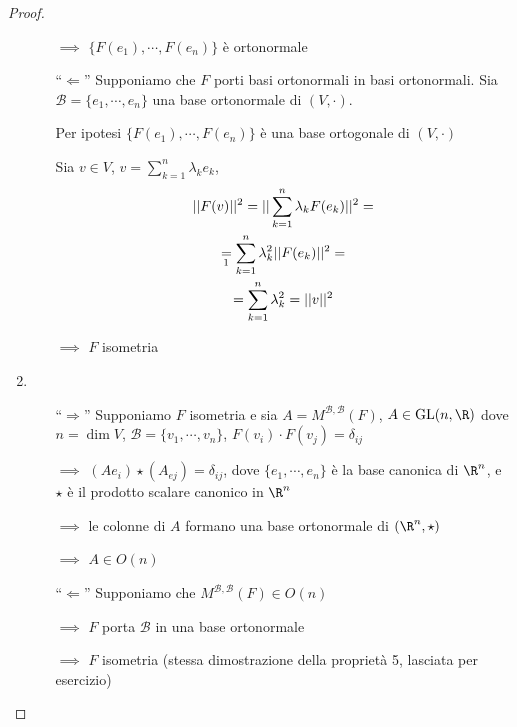 \begin{proof}
\begin{enumerate}
\begin{itemize}
        $\implies$ $ \{F(e_1), \cdots, F(e_{n} )\} $ è ortonormale
        \item [``$\Leftarrow$''] Supponiamo che $ F $ porti basi ortonormali in basi ortonormali. Sia $ \mathscr{B}=\{e_1, \cdots, e_{n} \} $ una base ortonormale di $ (V, \cdot ) $. 
        
        Per ipotesi $ \{F(e_1), \cdots, F(e_{n} )\} $ è una base ortogonale di $ (V, \cdot ) $

        Sia $ v \in V $, $ v=\sum_{k=1}^{n} \lambda_{k} e_{k} $, \begin{multline*} ||F(v)||^{2}=||\sum_{k=1}^{n} \lambda_{k} F(e_{k})||^{2}=\\\underset{\footnotemark}{=}\sum_{k=1}^{n} \lambda^{2}_k ||F(e_{k} )||^{2}=\\
        =\sum_{k=1}^{n} \lambda_{k}^{2}=||v||^{2}  \end{multline*} 
        
        $\implies$ $ F $ isometria
    \end{itemize}
    \item \begin{itemize}
        \item [``$\Rightarrow$''] Supponiamo $ F $ isometria e sia $ A=M^{ \mathscr{B}, \mathscr{B}}(F) $, $ A \in \text{GL}(n, \R) $ dove $ n = \dim V $, $ \mathscr{B}=\{v_1, \cdots, v_{n} \} $, $ F(v_{i} ) \cdot F(v_{j}) =\delta_{ij} $
        
        $ \implies $ $ (Ae_{i} ) \star (A_{ej} )=\delta_{ij}  $, dove $ \{e_1, \cdots, e_{n} \} $ è la base canonica di $ \R^{n} $, e $ \star  $ è il prodotto scalare canonico in $ \R^{n} $

        $ \implies $ le colonne di $ A $ formano una base ortonormale di $ (\R^{n}, \star) $ 

        $ \implies $ $A \in O(n)$

        \item [``$\Leftarrow$''] Supponiamo che $ M^{ \mathscr{B}, \mathscr{B}}(F) \in O(n)$ 
        
        $\implies$ $ F $ porta $ \mathscr{B} $ in una base ortonormale 
        
        $\implies$ $ F $ isometria (stessa dimostrazione della proprietà 5, lasciata per esercizio)
    \end{itemize}
\end{enumerate}
\end{proof}
